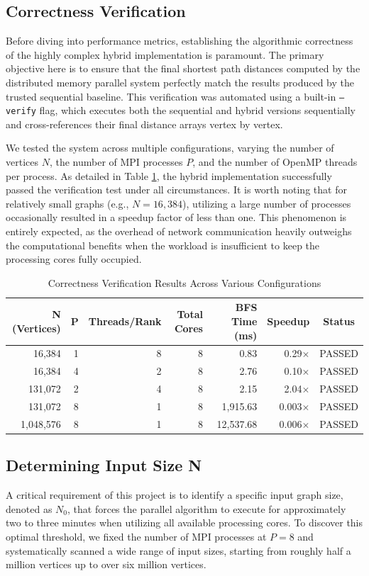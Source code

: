 \subsection{Correctness Verification}
Before diving into performance metrics, establishing the algorithmic correctness of the highly complex hybrid implementation is paramount. The primary objective here is to ensure that the final shortest path distances computed by the distributed memory parallel system perfectly match the results produced by the trusted sequential baseline. This verification was automated using a built-in \texttt{--verify} flag, which executes both the sequential and hybrid versions sequentially and cross-references their final distance arrays vertex by vertex.

We tested the system across multiple configurations, varying the number of vertices $N$, the number of MPI processes $P$, and the number of OpenMP threads per process. As detailed in Table \ref{tab:verify}, the hybrid implementation successfully passed the verification test under all circumstances. It is worth noting that for relatively small graphs (e.g., $N=16,384$), utilizing a large number of processes occasionally resulted in a speedup factor of less than one. This phenomenon is entirely expected, as the overhead of network communication heavily outweighs the computational benefits when the workload is insufficient to keep the processing cores fully occupied.

\begin{table}[H]
\centering
\caption{Correctness Verification Results Across Various Configurations}
\label{tab:verify}
\begin{tabular}{rrrrrrc}
\toprule
\textbf{N (Vertices)} & \textbf{P} & \textbf{Threads/Rank} & \textbf{Total Cores} & \textbf{BFS Time (ms)} & \textbf{Speedup} & \textbf{Status} \\
\midrule
16,384    & 1 & 8 & 8 &    0.83 & 0.29$\times$ & PASSED \\
16,384    & 4 & 2 & 8 &    2.76 & 0.10$\times$ & PASSED \\
131,072   & 2 & 4 & 8 &    2.15 & 2.04$\times$ & PASSED \\
131,072   & 8 & 1 & 8 & 1,915.63 & 0.003$\times$ & PASSED \\
1,048,576 & 8 & 1 & 8 & 12,537.68 & 0.006$\times$ & PASSED \\
\bottomrule
\end{tabular}
\end{table}

\subsection{Determining Input Size N}
A critical requirement of this project is to identify a specific input graph size, denoted as $N_0$, that forces the parallel algorithm to execute for approximately two to three minutes when utilizing all available processing cores. To discover this optimal threshold, we fixed the number of MPI processes at $P=8$ and systematically scanned a wide range of input sizes, starting from roughly half a million vertices up to over six million vertices.

